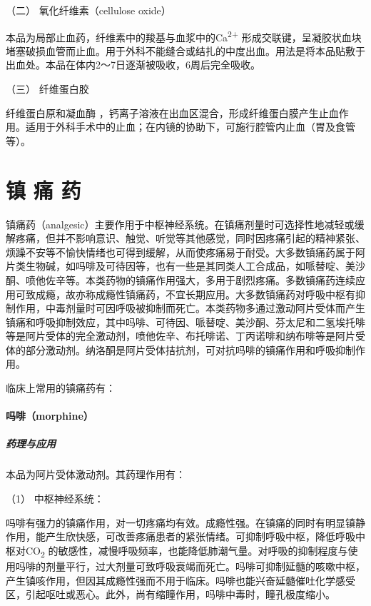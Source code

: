\hypertarget{text00438.htmlux5cux23CHP17-8-4-2}{}
（二） 氧化纤维素（cellulose oxide）

本品为局部止血药，纤维素中的羧基与血浆中的Ca\textsuperscript{2+}
形成交联键，呈凝胶状血块堵塞破损血管而止血。用于外科不能缝合或结扎的中度出血。用法是将本品贴敷于出血处。本品在体内2～7日逐渐被吸收，6周后完全吸收。

\hypertarget{text00438.htmlux5cux23CHP17-8-4-3}{}
（三） 纤维蛋白胶

纤维蛋白原和凝血酶
，钙离子溶液在出血区混合，形成纤维蛋白膜产生止血作用。适用于外科手术中的止血；在内镜的协助下，可施行腔管内止血（胃及食管等）。

\protect\hypertarget{text00439.html}{}{}

\chapter{镇 痛 药}

镇痛药（analgesic）主要作用于中枢神经系统。在镇痛剂量时可选择性地减轻或缓解疼痛，但并不影响意识、触觉、听觉等其他感觉，同时因疼痛引起的精神紧张、烦躁不安等不愉快情绪也可得到缓解，从而使疼痛易于耐受。大多数镇痛药属于阿片类生物碱，如吗啡及可待因等，也有一些是其同类人工合成品，如哌替啶、美沙酮、喷他佐辛等。本类药物的镇痛作用强大，多用于剧烈疼痛。多数镇痛药连续应用可致成瘾，故亦称成瘾性镇痛药，不宜长期应用。大多数镇痛药对呼吸中枢有抑制作用，中毒剂量时可因呼吸被抑制而死亡。本类药物多通过激动阿片受体而产生镇痛和呼吸抑制效应，其中吗啡、可待因、哌替啶、美沙酮、芬太尼和二氢埃托啡等是阿片受体的完全激动剂，喷他佐辛、布托啡诺、丁丙诺啡和纳布啡等是阿片受体的部分激动剂。纳洛酮是阿片受体拮抗剂，可对抗吗啡的镇痛作用和呼吸抑制作用。

临床上常用的镇痛药有：

\subsubsection{吗啡（morphine）}

\paragraph{药理与应用}

本品为阿片受体激动剂。其药理作用有：

\hypertarget{text00439.htmlux5cux23CHP17-9-1-1-1}{}
（1） 中枢神经系统：

吗啡有强力的镇痛作用，对一切疼痛均有效。成瘾性强。在镇痛的同时有明显镇静作用，能产生欣快感，可改善疼痛患者的紧张情绪。可抑制呼吸中枢，降低呼吸中枢对CO\textsubscript{2}
的敏感性，减慢呼吸频率，也能降低肺潮气量。对呼吸的抑制程度与使用吗啡的剂量平行，过大剂量可致呼吸衰竭而死亡。吗啡可抑制延髓的咳嗽中枢，产生镇咳作用，但因其成瘾性强而不用于临床。吗啡也能兴奋延髓催吐化学感受区，引起呕吐或恶心。此外，尚有缩瞳作用，吗啡中毒时，瞳孔极度缩小。

